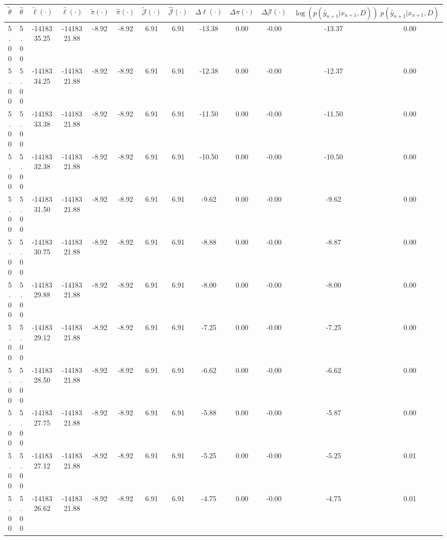 \begin{table}[htbp]
        \centering
        \tiny
        \begin{adjustbox}{angle=90}
            \begin{tabular}{|c|c|c|c|c|c|c|c|c|c|c|c|c|}
                \hline
                 $\tilde{\theta}$ & $\hat{\theta}$ & $\tilde{\ell}(\cdot)$ & $\hat{\ell}(\cdot)$ & $\tilde{\pi}(\cdot)$ & $\hat{\pi}(\cdot)$ & $\tilde{\mathcal{J}}(\cdot)$ & $\hat{\mathcal{J}}(\cdot)$ & $\Delta \ell(\cdot)$ & $\Delta \pi(\cdot)$ & $\Delta \mathcal{J}(\cdot)$ & $\log(p(\hat{y}_{n+1}|x_{n+1}, D))$ & $p(\hat{y}_{n+1}|x_{n+1}, D)$ \\
                \hline
                 5.00 & 5.00 & -1418335.25 & -1418321.88 & -8.92 & -8.92 & 6.91 & 6.91 & -13.38 & 0.00 & -0.00 & -13.37 & 0.00\\ \hline
 5.00 & 5.00 & -1418334.25 & -1418321.88 & -8.92 & -8.92 & 6.91 & 6.91 & -12.38 & 0.00 & -0.00 & -12.37 & 0.00\\ \hline
 5.00 & 5.00 & -1418333.38 & -1418321.88 & -8.92 & -8.92 & 6.91 & 6.91 & -11.50 & 0.00 & -0.00 & -11.50 & 0.00\\ \hline
 5.00 & 5.00 & -1418332.38 & -1418321.88 & -8.92 & -8.92 & 6.91 & 6.91 & -10.50 & 0.00 & -0.00 & -10.50 & 0.00\\ \hline
 5.00 & 5.00 & -1418331.50 & -1418321.88 & -8.92 & -8.92 & 6.91 & 6.91 & -9.62 & 0.00 & -0.00 & -9.62 & 0.00\\ \hline
 5.00 & 5.00 & -1418330.75 & -1418321.88 & -8.92 & -8.92 & 6.91 & 6.91 & -8.88 & 0.00 & -0.00 & -8.87 & 0.00\\ \hline
 5.00 & 5.00 & -1418329.88 & -1418321.88 & -8.92 & -8.92 & 6.91 & 6.91 & -8.00 & 0.00 & -0.00 & -8.00 & 0.00\\ \hline
 5.00 & 5.00 & -1418329.12 & -1418321.88 & -8.92 & -8.92 & 6.91 & 6.91 & -7.25 & 0.00 & -0.00 & -7.25 & 0.00\\ \hline
 5.00 & 5.00 & -1418328.50 & -1418321.88 & -8.92 & -8.92 & 6.91 & 6.91 & -6.62 & 0.00 & -0.00 & -6.62 & 0.00\\ \hline
 5.00 & 5.00 & -1418327.75 & -1418321.88 & -8.92 & -8.92 & 6.91 & 6.91 & -5.88 & 0.00 & -0.00 & -5.87 & 0.00\\ \hline
 5.00 & 5.00 & -1418327.12 & -1418321.88 & -8.92 & -8.92 & 6.91 & 6.91 & -5.25 & 0.00 & -0.00 & -5.25 & 0.01\\ \hline
 5.00 & 5.00 & -1418326.62 & -1418321.88 & -8.92 & -8.92 & 6.91 & 6.91 & -4.75 & 0.00 & -0.00 & -4.75 & 0.01\\ \hline

\end{tabular}
\end{adjustbox}
\end{table}
